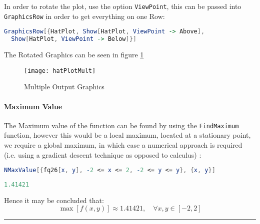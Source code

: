\documentclass[12pt]{article}
\begin{document}
In order to rotate the plot, use the option \verb|ViewPoint|, this can be passed into \verb|GraphicsRow| in order to get everything on one Row:

\begin{lstlisting}[language = Mathematica]
GraphicsRow[{HatPlot, Show[HatPlot, ViewPoint -> Above], 
  Show[HatPlot, ViewPoint -> Below]}]
\end{lstlisting}	


The Rotated Graphics can be seen in figure \ref{fig:hatplotmult}

\begin{figure}[h!]
	\centering
	\texttt{[image: hatPlotMult]}
	\caption[]{Multiple Output Graphics}
	\label{fig:hatplotmult}
\end{figure}

\paragraph{Maximum Value} The Maximum value of the function can be found by using the \verb|FindMaximum|  function, however this would be a local maximum, located at a stationary point, we require a global maximum, in which case a numerical approach is required (i.e. using a gradient descent technique as opposed to calculus) :

\begin{lstlisting}[language = Mathematica]
NMaxValue[{fq26[x, y], -2 <= x <= 2, -2 <= y <= y}, {x, y}]
\end{lstlisting}	

\begin{lstlisting}[language = Mathematica]
1.41421
\end{lstlisting}	

Hence it may be concluded that:
$$
\max\left[ f\left( x,y \right) \right] \approx 1.41421, \quad \forall  x,y \in \left[ -2,2 \right]
$$

\begin{flushright}
{\rule{0.7em}{0.7em}}
\end{flushright}
 
\end{document}
